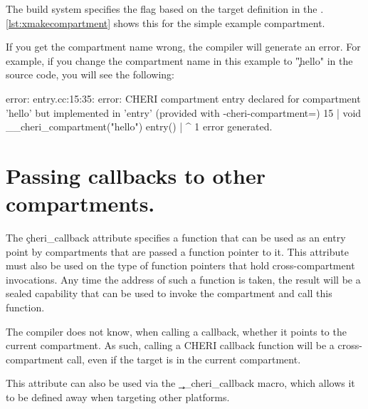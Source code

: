 {{\codelisting[filename=examples/compartment_annotation/compartment.cc,marker=increment,label=lst:incrementfn,caption="The body of a function that is exposed for cross-compartment calls."]{}

The build system specifies the  flag based on the  target definition in the .
\ref{lst:xmakecompartment} shows this for the simple example compartment.

\lualisting[filename=examples/compartment_annotation/xmake.lua,marker=compartment,label=lst:xmakecompartment,caption="Build system code for defining a compartment."]{}

If you get the compartment name wrong, the compiler will generate an error.
For example, if you change the compartment name in this example to \c{"hello"} in the source code, you will see the following:

\begin{console}
error: entry.cc:15:35: error: CHERI compartment entry declared for compartment 'hello' but implemented in 'entry' (provided with -cheri-compartment=)
   15 | void __cheri_compartment("hello") entry()
      |                                   ^
1 error generated.
\end{console}

\section[label=cheri_callback]{Passing callbacks to other compartments.}

The \c{cheri_callback} attribute specifies a function that can be used as an entry point by compartments that are passed a function pointer to it.
This attribute must also be used on the type of function pointers that hold cross-compartment invocations.
Any time the address of such a function is taken, the result will be a sealed capability that can be used to invoke the compartment and call this function.

\begin{note}
	The compiler does not know, when calling a callback, whether it points to the current compartment.
	As such, calling a CHERI callback function will  be a cross-compartment call, even if the target is in the current compartment.
\end{note}

This attribute can also be used via the \c{__cheri_callback} macro, which allows it to be defined away when targeting other platforms.

}}
